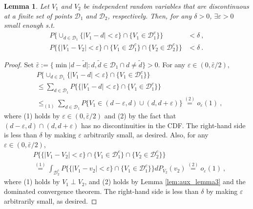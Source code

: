 \documentclass[11pt]{article}
\numberwithin{equation}{section}
\newtheorem{lemma}{Lemma}%
\begin{document}
\begin{lemma}\label{lem:aux_lemma4}
Let $V_{1}$ and $V_{2}$ be independent random variables that are discontinuous at a finite set of points $\mathcal{D}_{1}$ and $\mathcal{D}_{2}$, respectively. Then, for any $\delta >0$, $\exists \varepsilon >0$ small enough s.t.
\begin{align*}
P\{ \cup _{d\in \mathcal{D}_{1}}\{ |V_{1}-d|<\varepsilon \} \cap \{V_{1}\in \mathcal{D}_{1}^{c}\}\}  &<\delta ~, \\
P\{ \{ |V_{1}-V_{2}|<\varepsilon \} \cap \{V_{1}\in \mathcal{D}_{1}^{c}\}\cap \{ V_{2}\in \mathcal{D}_{2}^{c}\} \} &<\delta~ .
\end{align*}
\end{lemma}
\begin{proof}
Set $\bar{\varepsilon}:=\{ \min \vert d-\tilde{d}\vert :d,\tilde{d}\in \mathcal{D}_{1}\cap d\not=\tilde{d}\} >0$. For any $\varepsilon \in (0,\bar{\varepsilon}/2),$
\begin{align*}
&P\{ \cup _{d\in \mathcal{D}_{1}}\{ |V_{1}-d|<\varepsilon \}
\cap \{V_{1}\in \mathcal{D}_{1}^{c}\}\} \\
&\leq \sum_{d\in \mathcal{D}_{1}}P\{ \{|V_{1}-d|<\varepsilon \}\cap \{V_{1}\in \mathcal{D}_{1}^{c}\}\}  \\
&\leq _{(1)}\sum_{d\in \mathcal{D}_{1}}P\{ V_{1}\in (d-\varepsilon ,d)\cup (d,d+\varepsilon )\} \overset{(2)}{=} o_{\varepsilon }(1)~,
\end{align*}%
where (1) holds by $\varepsilon \in (0,\bar{\varepsilon}/2)$ and (2) by the fact that $(d-\varepsilon ,d)\cap (d,d+\varepsilon )$ has no discontinuities in the CDF. The right-hand side is less than $\delta $ by making $\varepsilon $
arbitrarily small, as desired. Also, for any $\varepsilon \in (0,\bar{\varepsilon}/2)$,
\begin{align*}
&P\{ \{ |V_{1}-V_{2}|<\varepsilon \} \cap \{V_{1}\in \mathcal{D}_{1}^{c}\}\cap \{ V_{2}\in \mathcal{D}_{2}^{c}\} \}  \\
&\overset{(1)}{=} \int_{\mathcal{D}_{2}^{c}}P\{ \{ |V_{1}-v_{2}|<\varepsilon \} \cap \{V_{1}\in \mathcal{D} _{1}^{c}\}\} dP_{V_{2}}( v_{2}) 
\overset{(2)}{=} o_{\varepsilon }(1)~,
\end{align*}
where (1) holds by $V_{1}\perp V_{2}$, and (2) holds by Lemma \ref{lem:aux_lemma3} and the dominated convergence theorem. The right-hand side is less than $\delta $ by making $\varepsilon $ arbitrarily small, as desired.
\end{proof}
\end{document}
